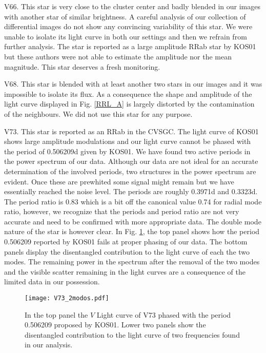 \documentclass[journal]{rmaa}
\newcommand{\1}{\'{\i}}
\begin{document}
V66. This star is very close to the cluster center and badly blended in our images
with another star of similar brightness. A careful analysis of our collection of
differential images do not show any convincing variability of this star. We were
unable to isolate its light curve in both our settings and then we refrain from
further analysis. The star is reported as a large amplitude RRab star by KOS01 but
these authors were not able to estimate the amplitude nor the mean magnitude. This
star deserves a fresh monitoring.

V68. This star is blended with at least another two stars in our images and it was
impossible to isolate its flux. As a consequence the shape and
amplitude of the light curve displayed in Fig. \ref{RRL_A} is largely distorted by the
contamination of the neighbours. We did not use this star for any purpose.

V73. This star is reported as an RRab in the CVSGC. The light curve of KOS01 shows
large
amplitude modulations and our light curve cannot be phased with the period of
0.506209d given by KOS01. We have found two active periods in the power spectrum of
our data. Although our
data are not ideal for an accurate determination
of the involved periods, two structures in the power spectrum are evident. Once
these are prewhited some signal might remain but we have essentially reached the
noise level. The periods are roughly 0.3971d and 0.3323d. The period
ratio is
0.83 which is a bit off the canonical value 0.74 for radial mode ratio, however, we
recognize that the periods and period ratio are not very accurate and need to be
confirmed with more appropriate data. The double mode nature of the star is
however clear. In Fig. \ref{LCV73}, the top panel shows how
the period 0.506209 reported by KOS01 fails at proper phasing of our data. The bottom
panels display the disentangled contribution to the light curve of each the two
modes. The remaining power in the
spectrum after the removal of the two modes and the visible
scatter remaining in the light curves are a consequence of the limited data in our
possession.


\begin{figure}
\begin{center}
\texttt{[image: V73\_2modos.pdf]}
\caption{In the top panel the $V$ Light curve of V73 phased with the period 0.506209
proposed by KOS01. Lower two panels show the disentangled contribution to the light
curve of two frequencies found in our analysis.}
\label{LCV73}
\end{center}
\end{figure}
\end{document}
